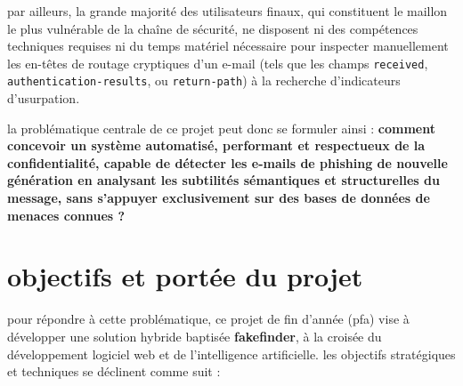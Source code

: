 \documentclass[12pt,a4paper]{report}
\begin{document}
par ailleurs, la grande majorité des utilisateurs finaux, qui constituent le maillon le plus vulnérable de la chaîne de sécurité, ne disposent ni des compétences techniques requises ni du temps matériel nécessaire pour inspecter manuellement les en-têtes de routage cryptiques d'un e-mail (tels que les champs \texttt{received}, \texttt{authentication-results}, ou \texttt{return-path}) à la recherche d'indicateurs d'usurpation.

la problématique centrale de ce projet peut donc se formuler ainsi : \textbf{comment concevoir un système automatisé, performant et respectueux de la confidentialité, capable de détecter les e-mails de phishing de nouvelle génération en analysant les subtilités sémantiques et structurelles du message, sans s'appuyer exclusivement sur des bases de données de menaces connues ?}

\section*{objectifs et portée du projet}
pour répondre à cette problématique, ce projet de fin d'année (pfa) vise à développer une solution hybride baptisée \textbf{fakefinder}, à la croisée du développement logiciel web et de l'intelligence artificielle. les objectifs stratégiques et techniques se déclinent comme suit :
\end{document}
